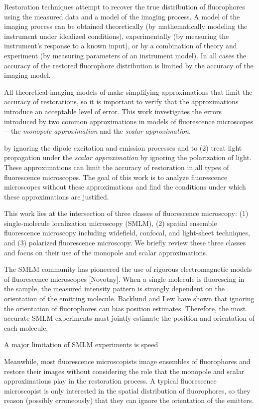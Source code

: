 \documentclass{osa-article}
\begin{document}
Restoration techniques attempt to recover the true distribution of fluorophores
using the measured data and a model of the imaging process. A model of the
imaging process can be obtained theoretically (by mathematically modeling the
instrument under idealized conditions), experimentally (by measuring the
instrument's response to a known input), or by a combination of theory and
experiment (by measuring parameters of an instrument model). In all cases the
accuracy of the restored fluorophore distribution is limited by the accuracy of
the imaging model.

All theoretical imaging models of make simplifying approximations that limit the
accuracy of restorations, so it is important to verify that the approximations
introduce an acceptable level of error. This work investigates the errors
introduced by two common approximations in models of fluorescence
microscopes---the \textit{monopole approximation} and the \textit{scalar
  approximation}.

by ignoring the
dipole excitation and emission processes and to (2) treat light propagation
under the \textit{scalar approximation} by ignoring the polarization of light.
These approximations can limit the accuracy of restoration in all types of
fluorescence microscopes. The goal of this work is to analyze fluorescence
microscopes without these approximations and find the conditions under which
these approximations are justified.

This work lies at the intersection of three classes of fluorescence microscopy:
(1) single-molecule localization microscopy (SMLM), (2) spatial ensemble
fluorescence microscopy including widefield, confocal, and light-sheet
techniques, and (3) polarized fluorescence microscopy. We briefly review these
three classes and focus on their use of the monopole and scalar approximations.

The SMLM community has pioneered the use of rigorous electromagnetic models of
fluorescence microscopes \cite{backer2014, lieb2004} [Novotny]. When a single
molecule is fluorescing in the sample, the measured intensity pattern is
strongly dependent on the orientation of the emitting molecule. Backlund and Lew
\cite{backlund2014} have shown that ignoring the orientation of fluorophores can
bias position estimates. Therefore, the most accurate SMLM experiments must
jointly estimate the position and orientation of each molecule.

A major limitation of SMLM experiments is speed

Meanwhile, most fluorescence microscopists image ensembles of fluorophores and
restore their images without considering the role that the monopole and scalar
approximations play in the restoration process. A typical fluorescence
microscopist is only interested in the spatial distribution of fluorophores, so
they reason (possibly erroneously) that they can ignore the orientation of the
emitters.
\end{document}

